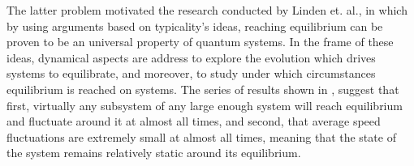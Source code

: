 \indent The latter problem motivated the research conducted by Linden et. al.\cite{linden_quantum_2009}, in which by using arguments based on typicality's ideas, reaching equilibrium can be proven to be an universal property of quantum systems. In the frame of these ideas, dynamical aspects are address to explore the evolution which drives systems to equilibrate, and moreover, to study under which circumstances equilibrium is reached on systems. The series of results shown in \cite{linden_quantum_2009,linden_speed_2010,malabarba_quantum_2014}, suggest that first, virtually any subsystem of any large enough system will reach equilibrium and fluctuate around it at almost all times, and second, that average speed fluctuations are extremely small at almost all times, meaning that the state of the system remains relatively static around its equilibrium. \\\

